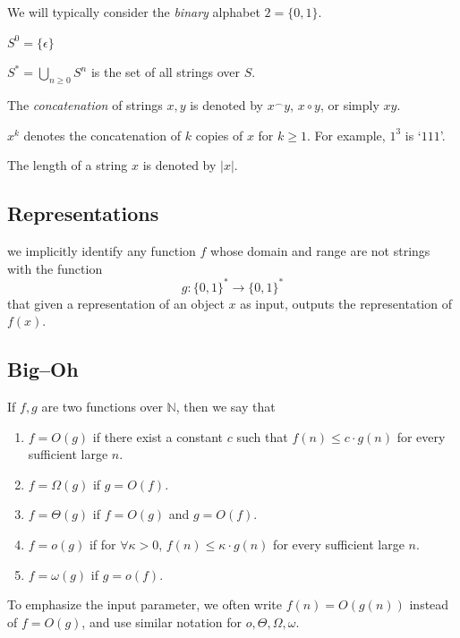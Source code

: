 We will typically consider the \textit{binary} alphabet $2 = \{0,1\}$.


$S^0 = \{\epsilon\}$

$S^* = \bigcup_{n \geq 0} S^n$ is the set of all strings over $S$.


The \textit{concatenation} of strings $x,y$ is denoted by $x^\frown y$, $x \circ y$, or simply $xy$.


$x^k$ denotes the concatenation of $k$ copies of $x$ for $k \geq 1$. 
% 
For example, 
$1^3$ is `$111$'.

The length of a string $x$ is denoted by $|x|$.


\subsection{Representations}


we implicitly identify any function $f$ whose domain and range are not strings with the function 
\[
    g \colon \{0,1\}^* \to \{0,1\}^*
\]
that given a representation of an object $x$ as input, 
outputs the representation of $f (x)$. 


\subsection{Big--Oh}



\begin{df}
    If $f,g$ are two functions over $\mathbb{N}$, 
    then we say that 
    \begin{enumerate}[itemsep=5pt,parsep=5pt,leftmargin=3em,topsep=5pt,label=(\arabic*)] %
        \item 
        {\color{purple} $f = O(g)$} if there exist a constant $c$ such that $f(n) \leq c \cdot g(n)$ for every sufficient large $n$.

        \item 
        $f = \Omega(g)$ if $g = O(f)$.

        \item 
        $f = \Theta (g)$ if $f=O(g)$ and $g=O(f)$.

        \item 
        {\color{purple} $f=o(g)$} if for $\forall \kappa > 0$, 
        $f(n) \leq \kappa \cdot g(n)$ for every sufficient large $n$.

        \item 
        $f = \omega(g)$ if $g = o(f)$.
    \end{enumerate}   

    To emphasize the input parameter, 
    we often write {\color{purple} $f(n)=O(g(n))$} instead of $f= O(g)$, 
    and use similar notation for $o,\Theta,\Omega,\omega$.
\end{df}



